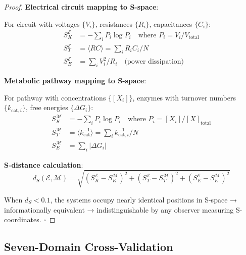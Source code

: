 \documentclass[11pt,a4paper]{article}
\theoremstyle{definition}
\theoremstyle{remark}
\begin{document}
\begin{proof}
\textbf{Electrical circuit mapping to S-space}:

For circuit with voltages $\{V_i\}$, resistances $\{R_i\}$, capacitances $\{C_i\}$:
\begin{align}
S_K^{\mathcal{E}} &= -\sum_i P_i \log P_i \quad \text{where } P_i = V_i / V_{\text{total}} \\
S_T^{\mathcal{E}} &= \langle RC \rangle = \sum_i R_i C_i / N \\
S_E^{\mathcal{E}} &= \sum_i V_i^2 / R_i \quad \text{(power dissipation)}
\end{align}

\textbf{Metabolic pathway mapping to S-space}:

For pathway with concentrations $\{[X_i]\}$, enzymes with turnover numbers $\{k_{\text{cat},i}\}$, free energies $\{\Delta G_i\}$:
\begin{align}
S_K^{\mathcal{M}} &= -\sum_i P_i \log P_i \quad \text{where } P_i = [X_i] / [X]_{\text{total}} \\
S_T^{\mathcal{M}} &= \langle k_{\text{cat}}^{-1} \rangle = \sum_i k_{\text{cat},i}^{-1} / N \\
S_E^{\mathcal{M}} &= \sum_i |\Delta G_i|
\end{align}

\textbf{S-distance calculation}:
\begin{equation}
d_S(\mathcal{E}, \mathcal{M}) = \sqrt{(S_K^{\mathcal{E}} - S_K^{\mathcal{M}})^2 + (S_T^{\mathcal{E}} - S_T^{\mathcal{M}})^2 + (S_E^{\mathcal{E}} - S_E^{\mathcal{M}})^2}
\end{equation}

When $d_S < 0.1$, the systems occupy nearly identical positions in S-space → informationally equivalent → indistinguishable by any observer measuring S-coordinates. $\square$
\end{proof}

\subsection{Seven-Domain Cross-Validation}
\end{document}
